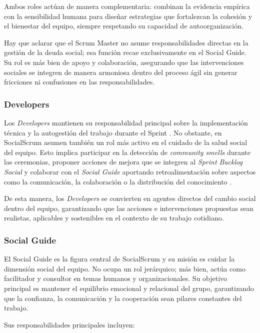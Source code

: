 Ambos roles actúan de manera complementaria: combinan la evidencia empírica con la sensibilidad humana para diseñar estrategias que fortalezcan la cohesión y el bienestar del equipo, siempre respetando su capacidad de autoorganización.

Hay que aclarar que el Scrum Master no asume responsabilidades directas en la gestión de la deuda social; esa función recae exclusivamente en el Social Guide. Su rol es más bien de apoyo y colaboración, asegurando que las intervenciones sociales se integren de manera armoniosa dentro del proceso ágil sin generar fricciones ni confusiones en las responsabilidades.

\subsubsection{Developers}

Los \textit{Developers} mantienen su responsabilidad principal sobre la implementación técnica y la autogestión del trabajo durante el Sprint \cite{schwaber2020scrum}. No obstante, en SocialScrum asumen también un rol más activo en el cuidado de la salud social del equipo. Esto implica participar en la detección de \textit{community smells} durante las ceremonias, proponer acciones de mejora que se integren al \textit{Sprint Backlog Social} y colaborar con el \textit{Social Guide} aportando retroalimentación sobre aspectos como la comunicación, la colaboración o la distribución del conocimiento \cite{saeeda2024nontechnicaldebt}.

De esta manera, los \textit{Developers} se convierten en agentes directos del cambio social dentro del equipo, garantizando que las acciones e intervenciones propuestas sean realistas, aplicables y sostenibles en el contexto de su trabajo cotidiano.

\subsubsection{Social Guide}

El Social Guide es la figura central de SocialScrum y su misión es cuidar la dimensión social del equipo. No ocupa un rol jerárquico; más bien, actúa como facilitador y consultor en temas humanos y organizacionales. Su objetivo principal es mantener el equilibrio emocional y relacional del grupo, garantizando que la confianza, la comunicación y la cooperación sean pilares constantes del trabajo.

Sus responsabilidades principales incluyen:

